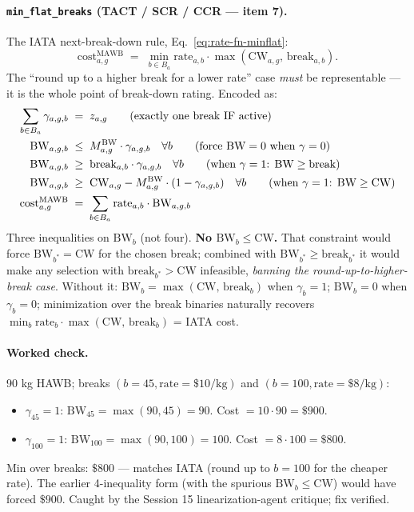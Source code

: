 \documentclass[11pt,a4paper]{article}
\theoremstyle{definition}
\begin{document}
\paragraph{\texttt{min\_flat\_breaks} (TACT / SCR / CCR --- item 7).}
The IATA next-break-down rule, Eq.~\ref{eq:rate-fn-minflat}:
\begin{equation}
  \text{cost}^{\text{MAWB}}_{a,g} \;=\; \min_{b \in B_a} \text{rate}_{a,b} \cdot \max(\text{CW}_{a,g},\, \text{break}_{a,b}).
  \label{eq:rate-fn-minflat}
\end{equation}
The ``round up to a higher break for a lower rate'' case \emph{must} be
representable --- it is the whole point of break-down rating. Encoded as:
\begin{align}
  \sum_{b \in B_a} \gamma_{a,g,b} \;&=\; z_{a,g}
    \tag{exactly one break IF active} \\
  \text{BW}_{a,g,b} \;&\leq\; M^{\text{BW}}_{a,g} \cdot \gamma_{a,g,b}
    \quad \forall b \tag{force $\text{BW} = 0$ when $\gamma = 0$} \\
  \text{BW}_{a,g,b} \;&\geq\; \text{break}_{a,b} \cdot \gamma_{a,g,b}
    \quad \forall b \tag{when $\gamma = 1$: $\text{BW} \geq \text{break}$} \\
  \text{BW}_{a,g,b} \;&\geq\; \text{CW}_{a,g} - M^{\text{BW}}_{a,g} \cdot (1 - \gamma_{a,g,b})
    \quad \forall b \tag{when $\gamma = 1$: $\text{BW} \geq \text{CW}$} \\
  \text{cost}^{\text{MAWB}}_{a,g} \;&=\; \sum_{b \in B_a} \text{rate}_{a,b} \cdot \text{BW}_{a,g,b}
\end{align}
Three inequalities on $\text{BW}_b$ (not four). \textbf{No $\text{BW}_b \leq
\text{CW}$.} That constraint would force $\text{BW}_{b^*} = \text{CW}$ for
the chosen break; combined with $\text{BW}_{b^*} \geq \text{break}_{b^*}$ it
would make any selection with $\text{break}_{b^*} > \text{CW}$ infeasible,
\emph{banning the round-up-to-higher-break case}. Without it: $\text{BW}_b =
\max(\text{CW},\, \text{break}_b)$ when $\gamma_b = 1$; $\text{BW}_b = 0$
when $\gamma_b = 0$; minimization over the break binaries naturally recovers
$\min_b \text{rate}_b \cdot \max(\text{CW},\, \text{break}_b)$ = IATA cost.

\paragraph{Worked check.}
90 kg HAWB; breaks $(b = 45, \text{rate} = \$10/\text{kg})$ and
$(b = 100, \text{rate} = \$8/\text{kg})$:
\begin{itemize}[noitemsep]
  \item $\gamma_{45} = 1$: $\text{BW}_{45} = \max(90, 45) = 90$. Cost $= 10 \cdot 90 = \$900$.
  \item $\gamma_{100} = 1$: $\text{BW}_{100} = \max(90, 100) = 100$. Cost $= 8 \cdot 100 = \$800$.
\end{itemize}
Min over breaks: $\$800$ --- matches IATA (round up to $b = 100$ for the
cheaper rate). The earlier 4-inequality form (with the spurious $\text{BW}_b
\leq \text{CW}$) would have forced $\$900$. Caught by the Session 15
linearization-agent critique; fix verified.
\end{document}
